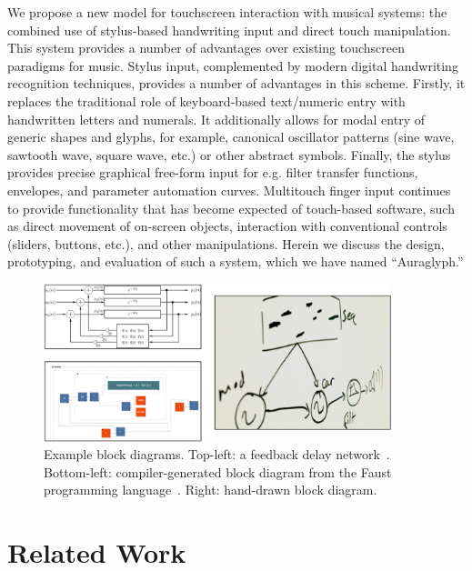 \documentclass{nime-alternate}
\begin{document}
We propose a new model for touchscreen interaction with musical systems: the combined use of stylus-based handwriting input and direct touch manipulation. 
This system provides a number of advantages over existing touchscreen paradigms for music. 
Stylus input, complemented by modern digital handwriting recognition techniques, provides a number of advantages in this scheme. 
Firstly, it replaces the traditional role of keyboard-based text/numeric entry with handwritten letters and numerals.
It additionally allows for modal entry of generic shapes and glyphs, for example, canonical oscillator patterns (sine wave, sawtooth wave, square wave, etc.) or other abstract symbols.
Finally, the stylus provides precise graphical free-form input for e.g. filter transfer functions, envelopes, and parameter automation curves. 
Multitouch finger input continues to provide functionality that has become expected of touch-based software, such as direct movement of on-screen objects, interaction with conventional controls (sliders, buttons, etc.), and other manipulations. 
Herein we discuss the design, prototyping, and evaluation of such a system, which we have named ``Auraglyph.''

\begin{figure}[h!]
	\centering
		\includegraphics[width=0.9\textwidth]{figures/block.png}
	\caption{Example block diagrams. Top-left: a feedback delay network\protect~\cite{smith2010pasp}. Bottom-left: compiler-generated block diagram from the Faust programming language\protect~\cite{faustOnline}. Right: hand-drawn block diagram.}
	\label{fig:blockDiagram}
\end{figure}

\section{Related Work}
\label{sec:RelatedWork}

\end{document}
